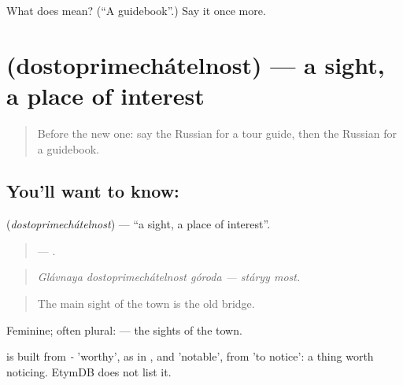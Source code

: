 \begin{tcolorbox}[breakable,colback=teal!4,colframe=teal!35!black,title={Before you move on}]
What does  mean? (\textquotedblleft{}A guidebook\textquotedblright{}.) Say it once more.
\end{tcolorbox}
\section[\texorpdfstring{\ru{достопримечательность} (dostoprimechátelnost)}{достопримечательность (dostoprimechátelnost)}]{ (dostoprimechátelnost) — a sight, a place of interest}

\label{lesson:RU-C442-dostoprimechatelnost}



\begin{quote}
Before the new one: say the Russian for a tour guide, then the Russian for a guidebook.
\end{quote}

\subsection*{You'll want to know: }
\textbf{} (\emph{dostoprimechátelnost}) — \textquotedblleft{}a sight, a place of interest\textquotedblright{}.

\begin{quote}
   —  .
\end{quote}

\begin{quote}
\emph{Glávnaya dostoprimechátelnost góroda — stáryy most.}
\end{quote}

\begin{quote}
The main sight of the town is the old bridge.
\end{quote}

Feminine; often plural: \emph{ } — the sights of the town.

\begin{cousinweb}
\emph{} is built from \emph{-} 'worthy', as in \emph{}, and \emph{} 'notable', from \emph{} 'to notice': a thing worth noticing. EtymDB does not list it.
\end{cousinweb}

